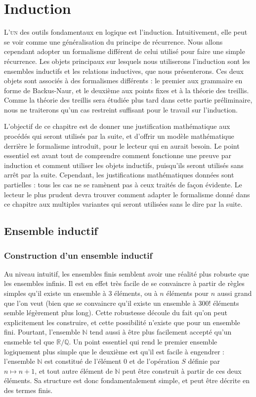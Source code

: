\chapter{Induction}
\label{chp.induction}

\minitoc

\lettrine{L}{'un} des outils fondamentaux en logique est l'induction.
Intuitivement, elle peut se voir comme une généralisation du principe de
récurrence. Nous allons cependant adopter un formalisme différent de celui
utilisé pour faire une simple récurrence. Les objets principaux sur lesquels
nous utiliserons l'induction sont les ensembles inductifs et les relations
inductives, que nous présenterons. Ces deux objets sont associés à des
formalismes différents : le premier aux grammaire en forme de Backus-Naur, et le
deuxième aux points fixes et à la théorie des treillis. Comme la théorie des
treillis sera étudiée plus tard dans cette partie préliminaire, nous ne
traiterons qu'un cas restreint suffisant pour le travail sur l'induction.

L'objectif de ce chapitre est de donner une justification mathématique aux
procédés qui seront utilisés par la suite, et d'offrir un modèle mathématique
derrière le formalisme introduit, pour le lecteur qui en aurait besoin. Le point
essentiel est avant tout de comprendre comment fonctionne une preuve par
induction et comment utiliser les objets inductifs, puisqu'ils seront utilisés
sans arrêt par la suite. Cependant, les justifications mathématiques données
sont partielles : tous les cas ne se ramènent pas à ceux traités de façon
évidente. Le lecteur le plus prudent devra trouver comment adapter le formalisme
donné dans ce chapitre aux multiples variantes qui seront utilisées sans le dire
par la suite.

\section{Ensemble inductif}

\subsection{Construction d'un ensemble inductif}

Au niveau intuitif, les ensembles finis semblent avoir une réalité plus
robuste que les ensembles infinis. Il est en effet très facile de se convaincre
à partir de règles simples qu'il existe un ensemble à $3$ éléments, ou à $n$
éléments pour $n$ aussi grand que l'on veut (bien que se convaincre qu'il existe
un ensemble à $300!$ éléments semble légèrement plus long). Cette robustesse
découle du fait qu'on peut explicitement les construire, et cette possibilité
n'existe que pour un ensemble fini. Pourtant, l'ensemble $\mathbb N$ tend aussi
à être plus facilement accepté qu'un ensmeble tel que $\mathbb R / \mathbb Q$.
Un point essentiel qui rend le premier ensemble logiquement plus simple que le
deuxième est qu'il est facile à engendrer : l'ensemble $\mathbb N$ est constitué
de l'élément $0$ et de l'opération $S$ définie par $n \mapsto n + 1$, et tout
autre élément de $\mathbb N$ peut être construit à partir de ces deux éléments.
Sa structure est donc fondamentalement simple, et peut être décrite en des
termes finis.

